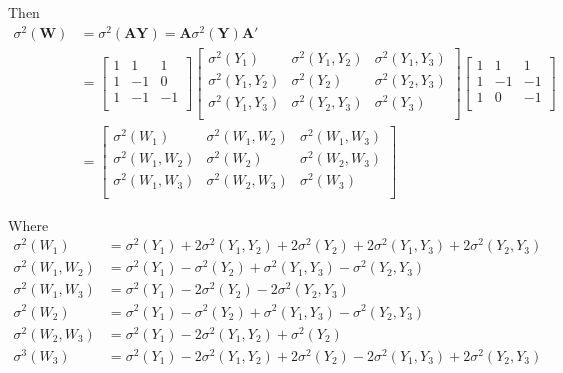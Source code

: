 \documentclass[12pt, letterpaper]{article}
\begin{document}
Then 
\begin{align*}
\sigma^{2}(\textbf{W}) &= \sigma^{2}(\textbf{A}\textbf{Y})=\textbf{A}\sigma^{2}(\textbf{Y})\textbf{A}'\\
&= \begin{bmatrix}
 1 & 1 & 1 \\
 1 & -1 & 0 \\
 1 & -1 & -1 \\
\end{bmatrix}
\begin{bmatrix}
\sigma ^2 (Y_1) & \sigma ^2 (Y_1, Y_2) & \sigma ^2 (Y_1,Y_3) \\
 \sigma ^2 (Y_1 ,Y_2) & \sigma ^2 (Y_2) & \sigma ^2 (Y_2, Y_3) \\
 \sigma ^2 (Y_1, Y_3) & \sigma ^2 (Y_2 ,Y_3) & \sigma ^2 (Y_3) \\
 \end{bmatrix} 
\begin{bmatrix}
1 & 1 & 1 \\
 1 & -1 & -1 \\
 1 & 0 & -1 \\
\end{bmatrix}\\
 &=
 \begin{bmatrix}
\sigma ^2 (W_1) & \sigma ^2 (W_1, W_2) & \sigma ^2 (W_1,W_3) \\
 \sigma ^2 (W_1 ,W_2) & \sigma ^2 (W_2) & \sigma ^2 (W_2, W_3) \\
 \sigma ^2 (W_1, W_3) & \sigma ^2 (W_2 ,W_3) & \sigma ^2 (W_3) \\
\end{bmatrix}
\end{align*}

Where 
\begin{align*}
\sigma^{2}(W_1) &= \sigma ^2 (Y_1)+2 \sigma ^2 (Y_1, Y_2)+2 \sigma ^2 (Y_2)+2 \sigma ^2 (Y_1, Y_3)+2 \sigma ^2 (Y_2 ,Y_3) \\
\sigma^{2}(W_1,W_2) &= \sigma ^2 (Y_1)-\sigma ^2 (Y_2)+\sigma ^2 (Y_1, Y_3)-\sigma ^2 (Y_2, Y_3) \\
\sigma^{2} (W_1,W_3) &= \sigma ^2 (Y_1)-2 \sigma ^2 (Y_2)-2 \sigma ^2 (Y_2, Y_3) \\
\sigma^{2}(W_{2}) &= \sigma ^2 (Y_1)-\sigma ^2 (Y_2)+\sigma ^2 (Y_1, Y_3)-\sigma ^2 (Y_2, Y_3) \\
\sigma^{2} (W_{2},W_{3}) &= \sigma ^2 (Y_1)-2 \sigma ^2 (Y_1, Y_2)+\sigma ^2 (Y_2) \\
\sigma^{3} (W_{3}) & = \sigma ^2 (Y_1)-2 \sigma ^2 (Y_1, Y_2)+2 \sigma ^2 (Y_2)-2 \sigma ^2 (Y_1, Y_3)+2 \sigma ^2 (Y_2, Y_3)
\end{align*}

\newpage
\end{document}
